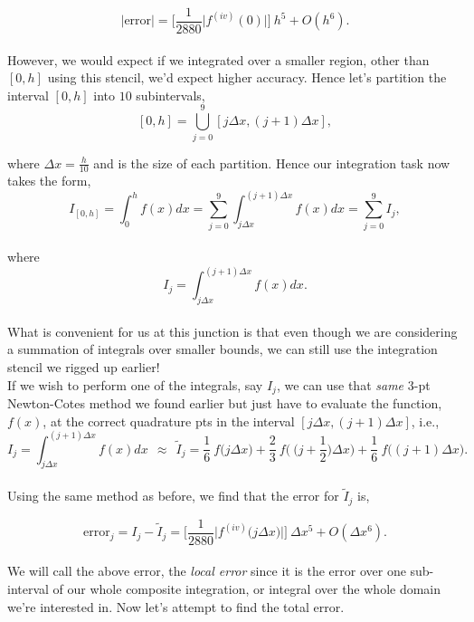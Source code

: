 \documentclass[paper=a4, fontsize=11pt]{scrartcl} %
\numberwithin{equation}{section} %
\numberwithin{figure}{section} %
\numberwithin{table}{section} %
\begin{document}
 $$\mbox{|error|} = \Bigg[\frac{1}{2880} \big|f^{(iv)}(0)\big| \Bigg]\ h^5 + O(h^6).$$\\
 
 However, we would expect if we integrated over a smaller region, other than $[0,h]$ using this stencil, we'd expect higher accuracy. Hence let's partition the interval $[0,h]$ into $10$ subintervals,\\
 
 $$[0,h] = \bigcup_{j=0}^{9} [j\Delta x,(j+1)\Delta x],$$
 
 where $\Delta x=\frac{h}{10}$ and is the size of each partition. Hence our integration task now takes the form,\\ 
 
 $$I_{[0,h]} = \int_0^h f(x) dx = \sum_{j=0}^{9} \int_{j\Delta x}^{(j+1)\Delta x} f(x) dx = \sum_{j=0}^{9} I_j,$$\\ %
 
 where\\
 
 $$I_j = \int_{j\Delta x}^{(j+1)\Delta x} f(x) dx.$$\\
 
 What is convenient for us at this junction is that even though we are considering a summation of integrals over smaller bounds, we can still use the integration stencil we rigged up earlier!\\
 
 If we wish to perform one of the integrals, say $I_j$, we can use that \emph{same} $3$-pt Newton-Cotes method we found earlier but just have to evaluate the function, $f(x)$, at the correct quadrature pts in the interval $[j\Delta x, (j+1)\Delta x]$, i.e.,\\
 
 $$I_j = \int_{j\Delta x}^{(j+1)\Delta x} f(x) dx\ \ \approx \ \ \tilde{I}_j =  \frac{1}{6}\ f\big(j \Delta x\big) + \frac{2}{3}\ f\Bigg(\ \Big(j+\frac{1}{2}\Big)\Delta x\Bigg) + \frac{1}{6}\ f\big((j+1)\Delta x\big).$$\\
 
 Using the same method as before, we find that the error for $\tilde{I}_j$ is,
 
 $$\mbox{error}_j = I_j - \tilde{I}_j =  \Bigg[\frac{1}{2880} \big|f^{(iv)}\big (j\Delta x\big)\big| \Bigg]\ \Delta x^5 + O(\Delta x^6).$$\\
 
 We will call the above error, the \emph{local error} since it is the error over one sub-interval of our whole composite integration, or integral over the whole domain we're interested in. Now let's attempt to find the total error.\\
 
\end{document}
